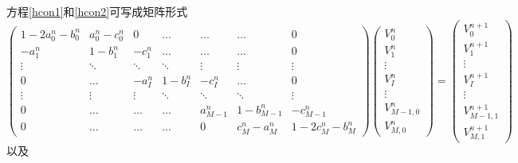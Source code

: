 \documentclass{ctexart} %
\begin{document}
方程\eqref{hcon1}和\eqref{hcon2}可写成矩阵形式
\begin{equation}
\label{meq1}
\left(
\begin{matrix}
1-2a^n_0-b^n_0 & a^n_0-c^n_0 & 0       &\ldots  & \ldots &\ldots     & 0 \\
-a^n_1       & 1-b^n_1   & -c^n_1    &\ldots  & \ldots &\ldots     & 0       \\
\vdots     & \ddots  & \ddots  &\ddots  & \vdots & \vdots   & \vdots   \\
0          & \ldots  & -a^n_I    & 1-b^n_I  & -c^n_I    & \ldots  & 0    \\
\vdots     & \vdots  & \vdots  &\ddots  & \ddots & \ddots   & \vdots   \\
0          & \ldots  & \ldots  &\ldots  & a^n_{M-1} & 1-b^n_{M-1} & -c^n_{M-1}   \\
0          & \ldots  & \ldots  &\ldots  &0        & c^n_M-a^n_M & 1-2c^n_M-b^n_M      
\end{matrix}
\right)
\left(
\begin{matrix}
V_0^n\\
V_1^n\\
\vdots\\
V_I^n\\
\vdots\\
V_{M-1,0}^n\\
V_{M,0}^n
\end{matrix}
\right)
=
\left(
\begin{matrix}
V_0^{n+1}\\
V_1^{n+1}\\
\vdots\\
V_I^{n+1}\\
\vdots\\
V_{M-1,1}^{n+1}\\
V_{M,1}^{n+1}
\end{matrix}
\right)
\end{equation}
以及
\end{document}
